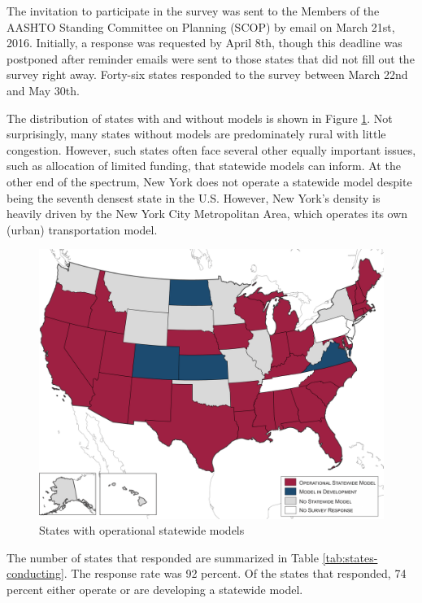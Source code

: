 The invitation to participate in the survey was sent to the Members of the AASHTO Standing Committee on Planning (SCOP) by email on March 21st, 2016. Initially, a response was requested by April 8th, though this deadline was postponed after reminder emails were sent to those states that did not fill out the survey right away. Forty-six states responded to the survey between March 22nd and May 30th.

The distribution of states with and without models is shown in Figure \ref{fig:states-with-operational-models}. Not surprisingly, many states without models are predominately rural with little congestion. However, such states often face several other equally important issues, such as allocation of limited funding, that statewide models can inform. At the other end of the spectrum, New York does not operate a statewide model despite being the seventh densest state in the U.S. However, New York's density is heavily driven by the New York City Metropolitan Area, which operates its own (urban) transportation model.

\begin{figure}
\centering
\includegraphics[width=6in]{graphics/01-states-with-operational-models}
\caption{States with operational statewide models}
\label{fig:states-with-operational-models}
\end{figure}

The number of states that responded are summarized in Table \ref{tab:states-conducting}. The response rate was 92 percent. Of the states that responded, 74 percent either operate or are developing a statewide model.

